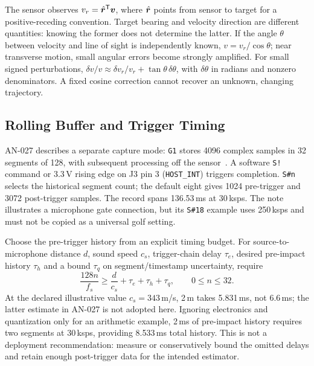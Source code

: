 The sensor observes $v_r=\hat{\bm{r}}^{\mathsf T}\bm{v}$, where $\hat{\bm{r}}$ points from sensor to target for a positive-receding convention.
Target bearing and velocity direction are different quantities: knowing the former does not determine the latter.
If the angle $\theta$ between velocity and line of sight is independently known, $v=v_r/\cos\theta$; near transverse motion, small angular errors become strongly amplified.
For small signed perturbations, $\delta v/v\approx\delta v_r/v_r+\tan\theta\,\delta\theta$, with $\delta\theta$ in radians and nonzero denominators.
A fixed cosine correction cannot recover an unknown, changing trajectory.

\subsection{Rolling Buffer and Trigger Timing}
AN-027 describes a separate capture mode: \texttt{G1} stores 4096 complex samples in 32 segments of 128, with subsequent processing off the sensor~\cite{an027}.
A software \texttt{S!} command or 3.3\,V rising edge on J3 pin 3 (\texttt{HOST\_INT}) triggers completion.
\texttt{S\#n} selects the historical segment count; the default eight gives 1024 pre-trigger and 3072 post-trigger samples.
The record spans 136.53\,ms at 30\,ksps.
The note illustrates a microphone gate connection, but its \texttt{S\#18} example uses 250\,ksps and must not be copied as a universal golf setting.

Choose the pre-trigger history from an explicit timing budget.
For source-to-microphone distance $d$, sound speed $c_s$, trigger-chain delay $\tau_e$, desired pre-impact history $\tau_h$ and a bound $\tau_q$ on segment/timestamp uncertainty, require
\begin{equation}
\label{eq:hardwaretriggerbudget}
 \frac{128n}{f_s}\ge \frac{d}{c_s}+\tau_e+\tau_h+\tau_q,
 \qquad 0\le n\le32.
\end{equation}
At the declared illustrative value $c_s=343$\,m/s, 2\,m takes 5.831\,ms, not 6.6\,ms; the latter estimate in AN-027 is not adopted here.
Ignoring electronics and quantization only for an arithmetic example, 2\,ms of pre-impact history requires two segments at 30\,ksps, providing 8.533\,ms total history.
This is not a deployment recommendation: measure or conservatively bound the omitted delays and retain enough post-trigger data for the intended estimator.

